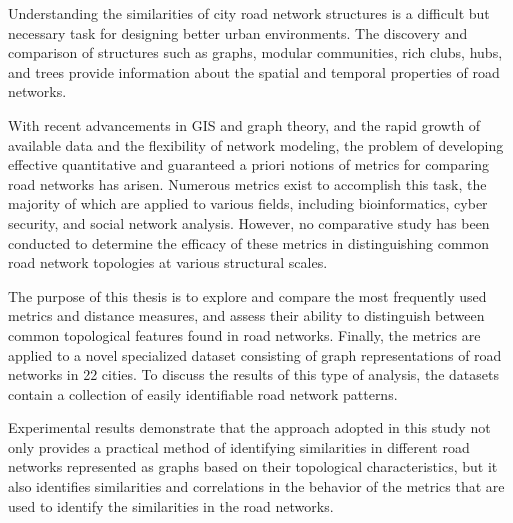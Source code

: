 
Understanding the similarities of city road network structures is a difficult but necessary task for designing better urban environments. The discovery and comparison of structures such as graphs, modular communities, rich clubs, hubs, and trees provide information about the spatial and temporal properties of road networks.

With recent advancements in GIS and graph theory, and the rapid growth of available data and the flexibility of network modeling, the problem of developing effective quantitative and guaranteed a priori notions of metrics for comparing road networks has arisen. Numerous metrics exist to accomplish this task, the majority of which are applied to various fields, including bioinformatics, cyber security, and social network analysis. However, no comparative study has been conducted to determine the efficacy of these metrics in distinguishing common road network topologies at various structural scales.

The purpose of this thesis is to explore and compare the most frequently used metrics and distance measures, and assess their ability to distinguish between common topological features found in road networks. Finally, the metrics are applied to a novel specialized dataset consisting of graph representations of road networks in 22 cities. To discuss the results of this type of analysis, the datasets contain a collection of easily identifiable road network patterns.

Experimental results demonstrate that the approach adopted in this study not only provides a practical method of identifying similarities in different road networks represented as graphs based on their topological characteristics, but it also identifies similarities and correlations in the behavior of the metrics that are used to identify the similarities in the road networks.
